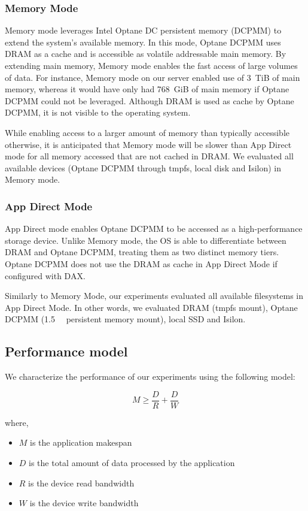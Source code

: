 \documentclass[conference]{IEEEtran}
\begin{document}
\subsubsection{Memory Mode}

Memory mode leverages Intel Optane DC persistent memory (DCPMM) to extend the system's available
memory. In this mode, Optane DCPMM uses DRAM as a cache and is accessible as
volatile addressable main memory. By extending main memory, Memory mode enables the
fast access of large volumes of data. For instance, Memory mode on our server enabled use of
3~TiB of main memory, whereas it would have only had 768~GiB of main memory if Optane DCPMM could not be
leveraged. Although DRAM is used as cache by Optane DCPMM, it is not visible to the operating system. 

While enabling access to a larger amount of memory than typically accessible otherwise,
it is anticipated that Memory mode will be slower than App Direct mode for all memory accessed that
are not cached in DRAM. We evaluated all available devices (Optane DCPMM through tmpfs, local disk and Isilon)
in Memory mode.

\subsubsection{App Direct Mode}

App Direct mode enables Optane DCPMM to be accessed as a high-performance storage device.
Unlike Memory mode, the OS is able to differentiate between DRAM and Optane DCPMM,
treating them as two distinct memory tiers. Optane DCPMM
does not use the DRAM as cache in App Direct Mode if configured with DAX.

Similarly to Memory Mode, our experiments evaluated all available filesystems in App Direct
Mode. In other words, we evaluated DRAM (tmpfs mount), Optane DCPMM (\SI{1.5}{\tebi\byte} persistent
memory mount), local SSD and Isilon.


\subsection{Performance model}

We characterize the performance of our experiments using the following model:

\begin{equation}
    M \geq \frac{D}{R} + \frac{D}{W} \label{eq:makespan}
\end{equation}

where,
\begin{itemize}
        \item $M$ is the application makespan
        \item $D$ is the total amount of data processed by the application
        \item $R$ is the device read bandwidth
        \item $W$ is the device write bandwidth
\end{itemize}
\end{document}

